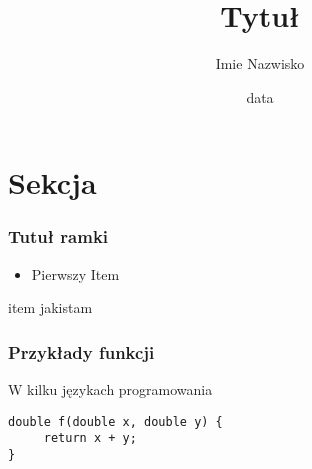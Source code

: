 \documentclass{beamer}
\title[Tytuł]{Tytuł}
\author{Imie Nazwisko}
\institute{Zakład pracy}
\date{data}
\begin{document}


\frame{\titlepage}

\section{Sekcja}

\begin{frame}[fragile]
	\frametitle{Tutuł ramki}
	\begin{itemize}
	\item Pierwszy Item
	\end{itemize}
	\BI
	\I item jakistam
	\EI
	\EB
\end{frame}

\begin{frame}[fragile]
	\frametitle{Przykłady funkcji}
	\begin{block}{W kilku językach programowania}
	\begin{verbatim}
double f(double x, double y) {
     return x + y;
}
	\end{verbatim}
	\end{block}
\end{frame}
\end{document}
